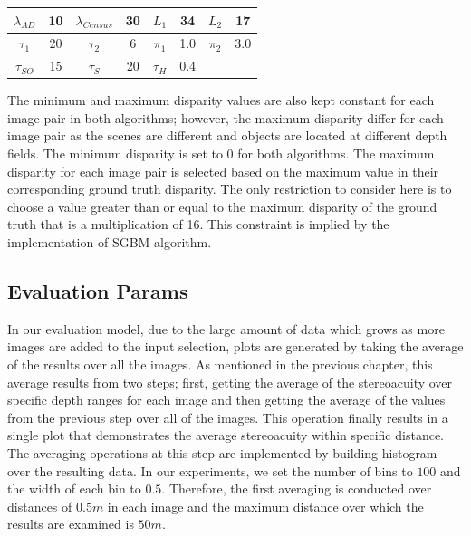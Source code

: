 {\footnotesize
\begin{minipage}{\linewidth}
\begin{center}
\label{tab:adcparams}
\begin{tabular}{|c|c|c|c|c|c|c|c|}
\hline
$\lambda_{AD}$ & 10 & $\lambda_{Census}$ & 30 & $L_{1}$ & 34 & $L_{2}$ & 17 \\ \hline
$\tau_{1}$ & 20 & $\tau_{2}$ & 6 & $\pi_{1}$ & 1.0 & $\pi_{2}$ & 3.0 \\ \hline 
$\tau_{SO}$ & 15 & $\tau_{S}$ & 20 & $\tau_{H}$ & 0.4 & & \\  \hline
\end{tabular}
\end{center}
\end{minipage} \newline
}

The minimum and maximum disparity values are also kept constant for each image pair in both algorithms; however, the maximum 
disparity differ for each image pair as the scenes are different
and objects are located at different depth fields.
The minimum disparity is set to $0$ for both algorithms. The maximum disparity for each image pair is selected based on the maximum value in their
corresponding ground truth disparity. The only restriction to consider here is to choose a value greater than or equal to 
the maximum disparity of the ground truth that is a multiplication of 16. This constraint
is implied by the implementation of SGBM algorithm.

\subsection{Evaluation Params}
In our evaluation model, due to the large amount of data which grows as more images are added to the input selection, 
plots are generated by taking the average of the results over all the images. As mentioned in the previous chapter, this average results from two steps; 
first, getting the average of the stereoacuity over specific
depth ranges for each image and then getting the average of the values from the previous step over all of the images. This operation finally results in a single plot
that demonstrates the average stereoacuity within specific distance.
The averaging operations at this step are implemented by building histogram over the resulting data. 
In our experiments, we set the number of bins to $100$ and the width of each bin to $0.5$. Therefore, the first averaging is conducted over distances of $0.5m$ 
in each image and the maximum distance over which the results are 
examined is $50m$.

